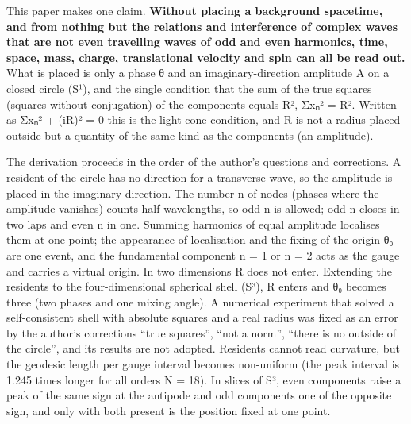 \documentclass[
  a4paper,
]{article}
\begin{document}
This paper makes one claim. \textbf{Without placing a background
spacetime, and from nothing but the relations and interference of
complex waves that are not even travelling waves of odd and even
harmonics, time, space, mass, charge, translational velocity and spin
can all be read out.} What is placed is only a phase θ and an
imaginary-direction amplitude A on a closed circle (S¹), and the single
condition that the sum of the true squares (squares without conjugation)
of the components equals R², Σxₙ² = R². Written as Σxₙ² + (iR)² = 0 this
is the light-cone condition, and R is not a radius placed outside but a
quantity of the same kind as the components (an amplitude).

The derivation proceeds in the order of the author's questions and
corrections. A resident of the circle has no direction for a transverse
wave, so the amplitude is placed in the imaginary direction. The number
n of nodes (phases where the amplitude vanishes) counts
half-wavelengths, so odd n is allowed; odd n closes in two laps and even
n in one. Summing harmonics of equal amplitude localises them at one
point; the appearance of localisation and the fixing of the origin θ₀
are one event, and the fundamental component n = 1 or n = 2 acts as the
gauge and carries a virtual origin. In two dimensions R does not enter.
Extending the residents to the four-dimensional spherical shell (S³), R
enters and θ₀ becomes three (two phases and one mixing angle). A
numerical experiment that solved a self-consistent shell with absolute
squares and a real radius was fixed as an error by the author's
corrections ``true squares'', ``not a norm'', ``there is no outside of
the circle'', and its results are not adopted. Residents cannot read
curvature, but the geodesic length per gauge interval becomes
non-uniform (the peak interval is 1.245 times longer for all orders N =
18). In slices of S³, even components raise a peak of the same sign at
the antipode and odd components one of the opposite sign, and only with
both present is the position fixed at one point.
\end{document}
